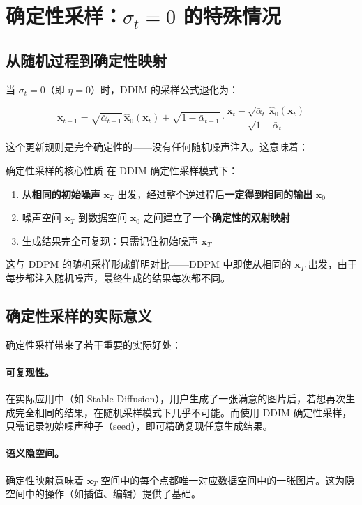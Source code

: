 \section{确定性采样：$\sigma_t = 0$ 的特殊情况}

\subsection{从随机过程到确定性映射}

当 $\sigma_t = 0$（即 $\eta = 0$）时，DDIM 的采样公式退化为：

$$
\mathbf{x}_{t-1} = \sqrt{\bar{\alpha}_{t-1}}\,\hat{\mathbf{x}}_0(\mathbf{x}_t) + \sqrt{1-\bar{\alpha}_{t-1}}\cdot\frac{\mathbf{x}_t - \sqrt{\bar{\alpha}_t}\,\hat{\mathbf{x}}_0(\mathbf{x}_t)}{\sqrt{1-\bar{\alpha}_t}}
$$

这个更新规则是完全确定性的——没有任何随机噪声注入。这意味着：

\begin{importantbox}{确定性采样的核心性质}
在 DDIM 确定性采样模式下：
\begin{enumerate}
    \item 从\textbf{相同的初始噪声} $\mathbf{x}_T$ 出发，经过整个逆过程后\textbf{一定得到相同的输出} $\mathbf{x}_0$
    \item 噪声空间 $\mathbf{x}_T$ 到数据空间 $\mathbf{x}_0$ 之间建立了一个\textbf{确定性的双射映射}
    \item 生成结果完全可复现：只需记住初始噪声 $\mathbf{x}_T$
\end{enumerate}
这与 DDPM 的随机采样形成鲜明对比——DDPM 中即使从相同的 $\mathbf{x}_T$ 出发，由于每步都注入随机噪声，最终生成的结果每次都不同。
\end{importantbox}

\subsection{确定性采样的实际意义}

确定性采样带来了若干重要的实际好处：

\paragraph{可复现性。} 在实际应用中（如 Stable Diffusion），用户生成了一张满意的图片后，若想再次生成完全相同的结果，在随机采样模式下几乎不可能。而使用 DDIM 确定性采样，只需记录初始噪声种子（seed），即可精确复现任意生成结果。

\paragraph{语义隐空间。} 确定性映射意味着 $\mathbf{x}_T$ 空间中的每个点都唯一对应数据空间中的一张图片。这为隐空间中的操作（如插值、编辑）提供了基础。

